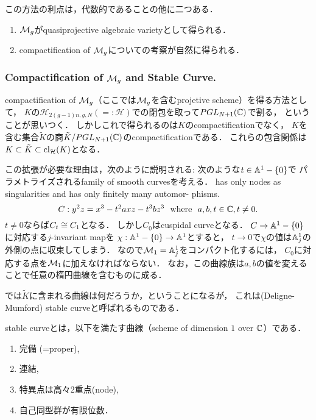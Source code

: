 \documentclass[a4paper]{jsarticle}
\newcommand{\modH}{\mathcal{H}}
\begin{document}
    この方法の利点は，代数的であることの他に二つある．
    \begin{enumerate}
        \item $\mathcal{M}_g$がquasiprojective algebraic varietyとして得られる．
        \item compactification of $\mathcal{M}_g$についての考察が自然に得られる．
    \end{enumerate}

    \subsubsection{Compactification of $\mathcal{M}_g$ and Stable Curve.}
    compactification of $\mathcal{M}_g$（ここでは$\mathcal{M}_g$を含むprojetive scheme）を得る方法として，
    $K$の$\modH_{2(g-1)n, g, N}(=:\modH)$での閉包を取って$PGL_{N+1}(\mathbb{C})$で割る，
    ということが思いつく．
    しかしこれで得られるのは$K$のcompactificationでなく，
    $K$を含む集合$\tilde{K}$の商$\tilde{K}/PGL_{N+1}(\mathbb{C})$のcompactificationである．
    これらの包含関係は$K \subset \tilde{K} \subset \cl_{\modH}(K)$となる．
    
    この拡張が必要な理由は，次のように説明される:
    次のような$t \in \mathbb{A}^1-\{0\}$で
    パラメトライズされるfamily of smooth curvesを考える．
    has only nodes as singularities and has only finitely many automor-
    phisms.
    \[ C: y^2z=x^3-t^2axz-t^3bz^3 ~~\text{where}~~ a,b,t \in \mathbb{C}, t \neq 0. \]
    $t \neq 0$ならば$C_t \cong C_1$となる．
    しかし$C_0$はcuspidal curveとなる．
    $C \to \mathbb{A}^1-\{0\}$に対応する$j$-invariant mapを
    $\chi: \mathbb{A}^1-\{0\} \to \mathbb{A}^1$とすると，
    $t \to 0$で$\chi$の値は$\mathbb{A}^1_j$の外側の点に収束してしまう．
    なので$\mathcal{M}_1=\mathbb{A}^1_j$をコンパクト化するには，
    $C_0$に対応する点を$\mathcal{M}_1$に加えなければならない．
    なお，この曲線族は$a,b$の値を変えることで任意の楕円曲線を含むものに成る．

    では$\tilde{K}$に含まれる曲線は何だろうか，ということになるが，
    これは(Deligne-Mumford) stable curveと呼ばれるものである．
    \begin{Def}
        stable curveとは，以下を満たす曲線（scheme of dimension $1$ over $\mathbb{C}$）である．
        \begin{enumerate}
            \item 完備 (=proper),
            \item 連結,
            \item 特異点は高々2重点(node),
            \item 自己同型群が有限位数．
        \end{enumerate}
    \end{Def}
\end{document}
